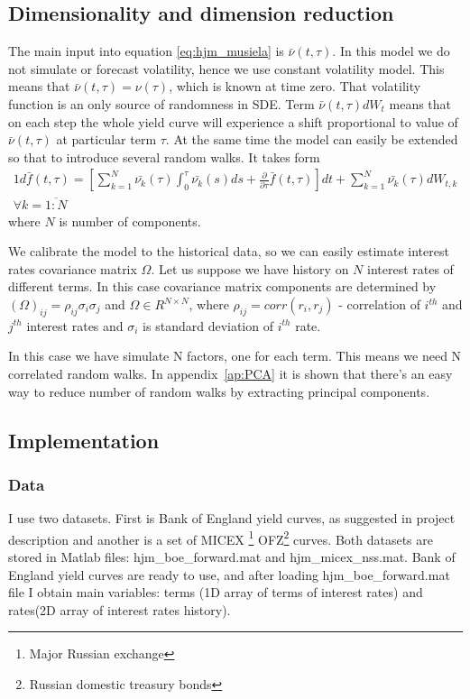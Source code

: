 \documentclass[11pt]{article} %
\begin{document}
\subsection{Dimensionality and dimension reduction}
The main input into equation \eqref{eq:hjm_musiela} is $\bar{\nu}(t,\tau)$. In this model we do not simulate or forecast volatility, hence we use constant volatility model. This means that $\bar{\nu}(t,\tau) = \nu(\tau)$, which is known at time zero. That volatility function is an only source of randomness in SDE. Term $\bar{\nu}(t,\tau)dW_t$ means that on each step the whole yield curve will experience a shift proportional to value of $\bar{\nu}(t,\tau)$ at particular term $\tau$. At the same time the model can easily be extended so that to introduce several random walks. It takes form
\begin{alignat}{1} \label{eq:hjm_musiela_multidim}
d\bar{f}(t,\tau) = \left[\sum_{k=1}^N\bar{\nu_k}(\tau)\int_{0}^{\tau}\bar{\nu_k}(s)ds+ \frac{\partial}{\partial \tau}\bar{f}(t,\tau)\right]dt + \sum_{k=1}^N\bar{\nu_k}(\tau)dW_{t, k}\\
\forall k = \overline{1:N} \nonumber
\end{alignat}
where $N$ is number of components.

We calibrate the model to the historical data, so we can easily estimate interest rates covariance matrix $\Omega$. Let us suppose we have history on $N$ interest rates of different terms. In this case covariance matrix components are determined by $(\Omega)_{ij} = \rho_{ij}\sigma_{i}\sigma_{j}$ and $\Omega \in R^{N \times N}$, where $\rho_{ij} = corr(r_i,r_j)$ - correlation of $i^{th}$ and $j^{th}$ interest rates and $\sigma_i$ is standard deviation of $i^{th}$ rate.

In this case we have simulate N factors, one for each term. This means we need N correlated random walks. In appendix~\ref{ap:PCA} it is shown that there's an easy way to reduce number of random walks by extracting principal components.


\subsection{Implementation}
\subsubsection{Data}
I use two datasets. First is Bank of England yield curves, as suggested in project description and another is a set of MICEX \footnote{Major Russian exchange} OFZ\footnote{Russian domestic treasury bonds} curves. 
Both datasets are stored in Matlab files: hjm\_boe\_forward.mat and hjm\_micex\_nss.mat.
Bank of England yield curves are ready to use, and after loading hjm\_boe\_forward.mat file I obtain main variables: terms (1D array of terms of interest rates) and rates(2D array of interest rates history). 
\end{document}
